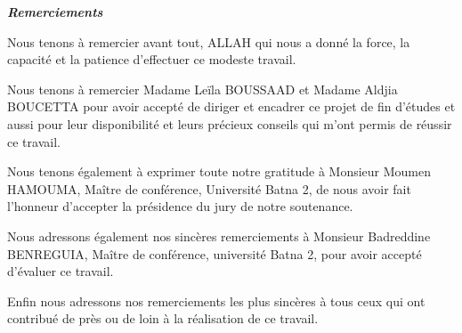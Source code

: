 \newpage
\thispagestyle{empty}
\begin{center}
\textcolor[rgb]{0,0,1}{{\Huge\textbf{\textit{Remerciements}}}}
\end{center}

\vspace{1 cm}

\begin{center}
Nous tenons à remercier avant tout, ALLAH qui nous a donné la force, la capacité et la patience d'effectuer ce  modeste travail.

Nous tenons à remercier Madame Leïla BOUSSAAD et Madame Aldjia BOUCETTA pour avoir accepté de diriger et encadrer ce projet de fin d'études et aussi pour leur disponibilité et leurs précieux conseils qui m'ont permis de réussir ce travail.

Nous tenons également à exprimer toute notre gratitude à Monsieur Moumen HAMOUMA,  Maître de conférence, Université Batna 2, de nous avoir fait l'honneur d'accepter la présidence du jury de notre soutenance.

Nous adressons également nos sincères remerciements à Monsieur  Badreddine BENREGUIA, Maître de conférence, université Batna 2, pour avoir accepté d'évaluer ce travail.

Enfin nous adressons nos remerciements les plus sincères à tous ceux qui ont contribué de près ou de loin à la réalisation de ce travail.
\end{center}